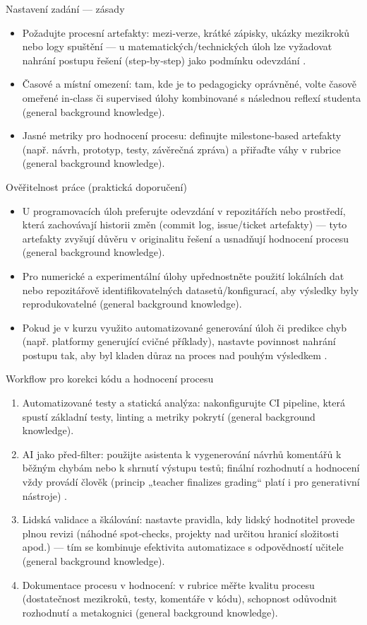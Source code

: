 \documentclass{report}%
\begin{document}
Nastavení zadání — zásady
\begin{itemize}
  \item Požadujte procesní artefakty: mezi‑verze, krátké zápisky, ukázky mezikroků nebo logy spuštění — u matematických/technických úloh lze vyžadovat nahrání postupu řešení (step‑by‑step) jako podmínku odevzdání \cite{kb_ai_101_tipu_pdf_04e4a115_page_8_1}.
  \item Časové a místní omezení: tam, kde je to pedagogicky oprávněné, volte časově omeřené in‑class či supervised úlohy kombinované s následnou reflexí studenta (general background knowledge).
  \item Jasné metriky pro hodnocení procesu: definujte milestone‑based artefakty (např. návrh, prototyp, testy, závěrečná zpráva) a přiřaďte váhy v rubrice (general background knowledge).
\end{itemize}

Ověřitelnost práce (praktická doporučení)
\begin{itemize}
  \item U programovacích úloh preferujte odevzdání v repozitářích nebo prostředí, která zachovávají historii změn (commit log, issue/ticket artefakty) — tyto artefakty zvyšují důvěru v originalitu řešení a usnadňují hodnocení procesu (general background knowledge).
  \item Pro numerické a experimentální úlohy upřednostněte použití lokálních dat nebo repozitářově identifikovatelných datasetů/konfigurací, aby výsledky byly reprodukovatelné (general background knowledge).
  \item Pokud je v kurzu využito automatizované generování úloh či predikce chyb (např. platformy generující cvičné příklady), nastavte povinnost nahrání postupu tak, aby byl kladen důraz na proces nad pouhým výsledkem \cite{kb_ai_101_tipu_pdf_04e4a115_page_8_1}.
\end{itemize}

Workflow pro korekci kódu a hodnocení procesu
\begin{enumerate}
  \item Automatizované testy a statická analýza: nakonfigurujte CI pipeline, která spustí základní testy, linting a metriky pokrytí (general background knowledge).
  \item AI jako před‑filter: použijte asistenta k vygenerování návrhů komentářů k běžným chybám nebo k shrnutí výstupu testů; finální rozhodnutí a hodnocení vždy provádí člověk (princip „teacher finalizes grading“ platí i pro generativní nástroje) \cite{kb_ai_101_tipu_pdf_04e4a115_page_8_1}.
  \item Lidská validace a škálování: nastavte pravidla, kdy lidský hodnotitel provede plnou revizi (náhodné spot‑checks, projekty nad určitou hranicí složitosti apod.) — tím se kombinuje efektivita automatizace s odpovědností učitele (general background knowledge).
  \item Dokumentace procesu v hodnocení: v rubrice měřte kvalitu procesu (dostatečnost mezikroků, testy, komentáře v kódu), schopnost odůvodnit rozhodnutí a metakognici (general background knowledge).
\end{enumerate}
\end{document}
